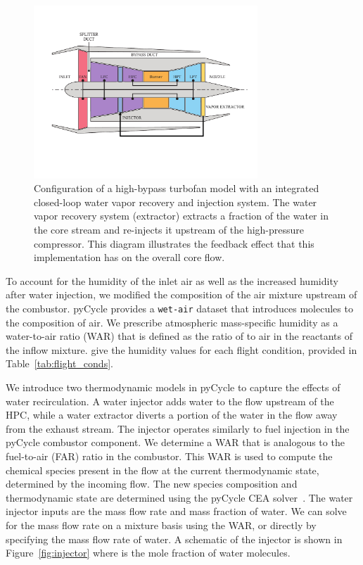 \documentclass[conf]{new-aiaa}
\begin{document}
\begin{figure}[hbt!]
  \centering
  \includegraphics[width=0.75\textwidth]{turbofan_wvr.pdf}
  \caption{
    Configuration of a high-bypass turbofan model with an integrated closed-loop water vapor recovery and injection system.
    The water vapor recovery system (extractor) extracts a fraction of the water in the core stream and re-injects it upstream of the high-pressure compressor.
    This diagram illustrates the feedback effect that this implementation has on the overall core flow.}
  \label{fig:n3_cycle}
\end{figure}

To account for the humidity of the inlet air as well as the increased humidity after water injection, we modified the composition of the air mixture upstream of the combustor.
pyCycle provides a \texttt{wet-air} dataset that introduces  molecules to the composition of air.
We prescribe atmospheric mass-specific humidity as a water-to-air ratio (WAR) that is defined as the ratio of  to air in the reactants of the inflow mixture.
\citet{Kalnay1996} give the humidity values for each flight condition, provided in Table~\ref{tab:flight_conds}.

We introduce two thermodynamic models in pyCycle to capture the effects of water recirculation.
A water injector adds water to the flow upstream of the HPC, while a water extractor diverts a portion of the water in the flow away from the exhaust stream.
The injector operates similarly to fuel injection in the pyCycle combustor component.
We determine a WAR that is analogous to the fuel-to-air (FAR) ratio in the combustor.
This WAR is used to compute the chemical species present in the flow at the current thermodynamic state, determined by the incoming flow.
The new species composition and thermodynamic state are determined using the pyCycle CEA solver~\cite{Gray2017b}.
The water injector inputs are the mass flow rate and mass fraction of water.
We can solve for the mass flow rate on a mixture basis using the WAR, or directly by specifying the mass flow rate of water.
A schematic of the injector is shown in Figure~\ref{fig:injector} where  is the mole fraction of water molecules.
\end{document}
